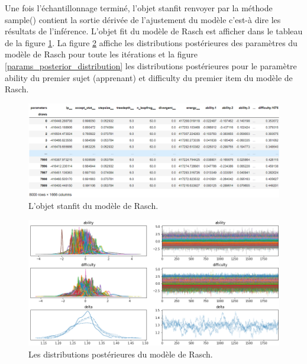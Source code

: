 Une fois l’échantillonnage terminé, l’objet \colorbox{gray!30}{stanfit} renvoyer par la méthode \colorbox{gray!30}{sample()} contient la sortie dérivée de l’ajustement du modèle c’est-à dire les résultats de l’inférence. L’objet \colorbox{gray!30}{fit} du modèle de Rasch est afficher dans le tableau de la figure \ref{stanfit_object}. La figure \ref{model_trace-plot} affiche les distributions postérieures des paramètres du modèle de Rasch pour toute les itérations et la figure \ref{params_posterior_distribution} les distributions postérieures pour le paramètre \colorbox{gray!30}{ability} du premier sujet (apprenant) et \colorbox{gray!30}{difficulty} du premier item du modèle de Rasch.
\begin{figure}[H]
	\begin{center}
		\includegraphics[width=\textwidth]{images/chapitre7/stanfit_object.png}
	\end{center}
	\caption{L’objet stanfit du modèle de Rasch.}
	\label{stanfit_object}
\end{figure}


\begin{figure}[H]
	\begin{center}
		\includegraphics[width=\textwidth]{images/chapitre7/model_plot-trace.png}
	\end{center}
	\caption{Les distributions postérieures du modèle de Rasch.}
	\label{model_trace-plot}
\end{figure}

